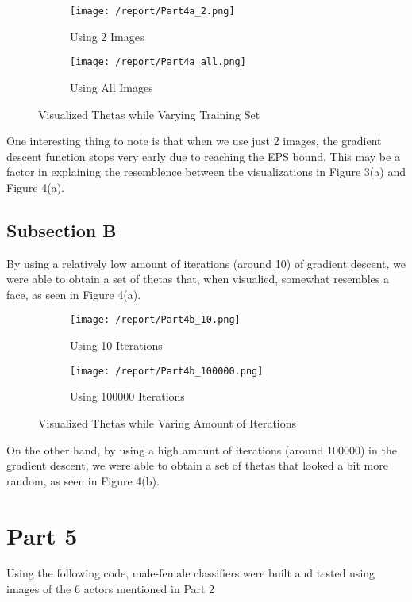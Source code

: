 \documentclass[11pt,a4paper]{report}
\begin{document}
\begin{figure}[h]
\centering
\begin{subfigure}{.5\textwidth}
  \centering
  \texttt{[image: /report/Part4a\_2.png]}
  \caption{Using 2 Images}
  \label{fig:sub1}
\end{subfigure}%
\begin{subfigure}{.5\textwidth}
  \centering
  \texttt{[image: /report/Part4a\_all.png]}
  \caption{Using All Images}
  \label{fig:sub2}
\end{subfigure}
\caption{Visualized Thetas while Varying Training Set}
\label{fig:test}
\end{figure}

One interesting thing to note is that when we use just 2 images, the gradient descent function stops very early due to reaching the EPS bound. This may be a factor in explaining the resemblence between the visualizations in Figure 3(a) and Figure 4(a).

\subsection*{Subsection B}
By using a relatively low amount of iterations (around 10) of gradient descent, we were able to obtain a set of thetas that, when visualied, somewhat resembles a face, as seen in Figure 4(a).

\begin{figure}[h]
\centering
\begin{subfigure}{.5\textwidth}
  \centering
  \texttt{[image: /report/Part4b\_10.png]}
  \caption{Using 10 Iterations}
  \label{fig:sub1}
\end{subfigure}%
\begin{subfigure}{.5\textwidth}
  \centering
  \texttt{[image: /report/Part4b\_100000.png]}
  \caption{Using 100000 Iterations}
  \label{fig:sub2}
\end{subfigure}
\caption{Visualized Thetas while Varing Amount of Iterations}
\label{fig:test}
\end{figure}

On the other hand, by using a high amount of iterations (around 100000) in the gradient descent, we were able to obtain a set of thetas that looked a bit more random, as seen in Figure 4(b).

\section*{Part 5}
Using the following code, male-female classifiers were built and tested using images of the 6 actors mentioned in Part 2
\end{document}
